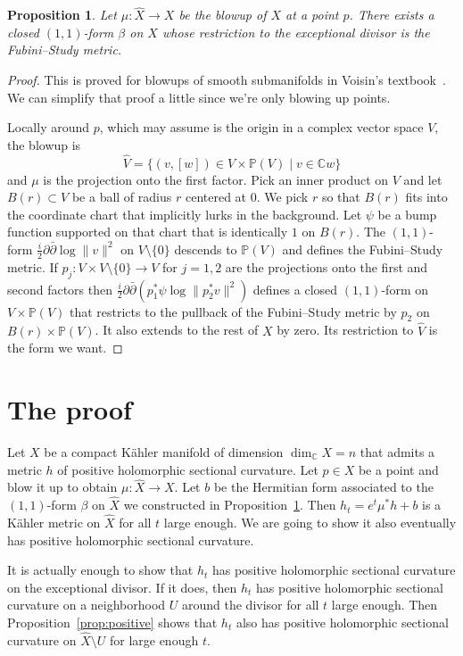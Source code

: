 \documentclass[10pt,a4paper]{amsart}
\newtheorem{prop}[theo]{Proposition}
\newcommand{\kk}[1]{\mathbb{#1}}
\def\hsc{holomorphic sectional curvature}
\def\bl#1{\widehat{#1}}
\begin{document}
\begin{prop}
\label{prop:fs}
Let $\mu : \bl X \to X$ be the blowup of $X$ at a point $p$.
There exists a closed $(1,1)$-form $\beta$ on $X$ whose restriction to
the exceptional divisor is the Fubini--Study metric.
\end{prop}

\begin{proof}
This is proved for blowups of smooth submanifolds in
Voisin's textbook~\cite{voisin2002theorie}. We can simplify that proof a little
since we're only blowing up points.

Locally around $p$, which may assume is the origin in a complex vector space
$V$, the blowup is
$$
\bl V
= \{ (v,[w]) \in V \times \kk P(V) \mid v \in \kk C w \}
$$
and $\mu$ is the projection onto the first factor.
Pick an inner product on $V$ and let $B(r) \subset V$ be a ball of radius $r$
centered at $0$.
We pick $r$ so that $B(r)$ fits into the coordinate chart that implicitly lurks
in the background.
Let $\psi$ be a bump function supported on that chart that is identically $1$
on $B(r)$.
The $(1,1)$-form $\frac i2 \partial\bar\partial \log \|v\|^2$ on $V \setminus
\{0\}$ descends to $\kk P(V)$ and defines the Fubini--Study metric.
If $p_j : V \times V \setminus \{0\} \to V$ for $j = 1,2$ are the projections
onto the first and second factors then
$\frac i2 \partial \bar\partial (p_1^*\psi \log \|p_2^*v\|^2)$
defines a closed $(1,1)$-form on $V \times \kk P(V)$ that restricts to the
pullback of the Fubini--Study metric by $p_2$ on $B(r) \times \kk P(V)$.
It also extends to the rest of $X$ by zero.
Its restriction to $\bl V$ is the form we want.
\end{proof}



\section{The proof}

Let $X$ be a compact K\"ahler manifold of dimension $\dim_{\kk C} X = n$ that
admits a metric $h$ of positive \hsc.
Let $p \in X$ be a point and blow it up to obtain $\mu : \bl X \to X$.
Let $b$ be the Hermitian form associated to the $(1,1)$-form $\beta$ on $\bl X$
we constructed in Proposition~\ref{prop:fs}.
Then $h_t = e^t \mu^*h + b$ is a K\"ahler metric on $\bl X$ for all $t$ large
enough.
We are going to show it also eventually has positive \hsc.

It is actually enough to show that $h_t$ has positive \hsc{} on the exceptional
divisor.
If it does, then $h_t$ has positive \hsc{} on a neighborhood $U$ around the
divisor for all $t$ large enough.
Then Proposition~\ref{prop:positive} shows that $h_t$ also has positive \hsc{}
on $\bl X \setminus U$ for large enough $t$.
\end{document}
